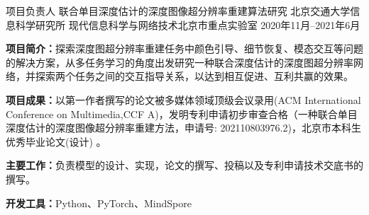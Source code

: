 

\begin{cventries}

	\cventry
	{项目负责人} %
	{联合单目深度估计的深度图像超分辨率重建算法研究 \href{https://dl.acm.org/doi/pdf/10.1145/3474085.3475373}{{\color{awesome}\faChain}}
	} %
	{北京交通大学信息科学研究所\newline\vspace{-0.5mm}\hspace{-10mm} 现代信息科学与网络技术北京市重点实验室} %
	{2020年11月--2021年6月} %
	{
		\begin{cvitems} %
			\item {\textbf{项目简介：}探索深度图超分辨率重建任务中颜色引导、细节恢复、模态交互等问题的解决方案，从多任务学习的角度出发研究一种联合深度估计的深度图超分辨率网络，并探索两个任务之间的交互指导关系，以达到相互促进、互利共赢的效果。}
			\item {\textbf{项目成果：}以第一作者撰写的论文被多媒体领域顶级会议录用(ACM International Conference on Multimedia,CCF A)，发明专利申请初步审查合格（一种联合单目深度估计的深度图像超分辨率重建方法，申请号: 202110803976.2)，北京市本科生优秀毕业论文(设计) \href{https://github.com/rmcong/BridgeNet_ACM-MM-2021}{{\color{awesome}\faGithub}}}。
			\item {\textbf{主要工作：}负责模型的设计、实现，论文的撰写、投稿以及专利申请技术交底书的撰写。}
			\item {\textbf{开发工具：}Python、PyTorch、MindSpore}
		\end{cvitems}
	}
	

\end{cventries}

